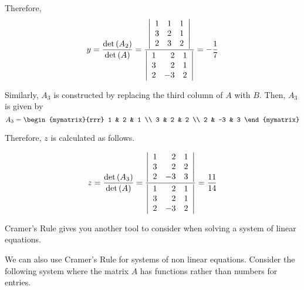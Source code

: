\begin{solution}
Therefore, 
\begin{equation*}
y=\vspace{0.05in}\frac{\det \tup{A_{2}}}{\det \tup{A}} = \vspace{0.05in}\frac{\left|
\begin{array}{rrr}
1 & 1 & 1 \\
3 & 2 & 1 \\
2 & 3 & 2
\end{array}
\right| }{\left|
\begin{array}{rrr}
1 & 2 & 1 \\
3 & 2 & 1 \\
2 & -3 & 2
\end{array}
\right| }=-\vspace{0.05in}\frac{1}{7}
\end{equation*}

Similarly, $A_3$ is constructed by replacing the third column of $A$ with $B$. Then, $A_3$ is given by
\begin{equation*}
A_3
=
\begin{mymatrix}{rrr}
1 & 2 & 1 \\
3 & 2 & 2 \\
2 & -3 & 3
\end{mymatrix}
\end{equation*}

Therefore, $z$ is calculated as follows. 

\begin{equation*}
z=
\vspace{0.05in}\frac{\det \tup{A_{3}}}{\det \tup{A}}
=
\frac{\left|
\begin{array}{rrr}
1 & 2 & 1 \\
3 & 2 & 2 \\
2 & -3 & 3
\end{array}
\right| }{\left|
\begin{array}{rrr}
1 & 2 & 1 \\
3 & 2 & 1 \\
2 & -3 & 2
\end{array}
\right| }=\frac{11}{14}
\end{equation*}
\end{solution}

Cramer's Rule gives you another tool to consider when solving a system of linear equations.

We can also use Cramer's Rule for systems of non linear equations. Consider the following system 
where the matrix $A$ has functions rather than numbers for entries. 

